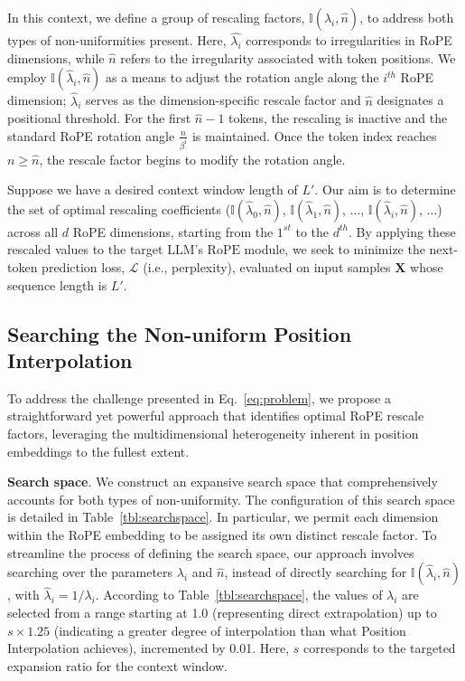 In this context, we define a group of rescaling factors, $\mathbb{I}(\hat{\lambda}_{i},\hat{n})$, to address both types of non-uniformities present. Here, $\hat{\lambda_i}$ corresponds to irregularities in RoPE dimensions, while $\hat{n}$ refers to the irregularity associated with token positions. We employ $\mathbb{I}(\hat{\lambda}_{i},\hat{n})$ as a means to adjust the rotation angle along the $i^{th}$ RoPE dimension; $\hat{\lambda}_{i}$ serves as the dimension-specific rescale factor and $\hat{n}$ designates a positional threshold. For the first $\hat{n}-1$ tokens, the rescaling is inactive and the standard RoPE rotation angle $\frac{n}{\beta^i}$ is maintained. Once the token index reaches $n\ge\hat{n}$, the rescale factor begins to modify the rotation angle.

Suppose we have a desired context window length of $L'$. Our aim is to determine the set of optimal rescaling coefficients ($\mathbb{I}(\hat{\lambda}_{0},\hat{n})$, $\mathbb{I}(\hat{\lambda}_{1},\hat{n})$, ..., $\mathbb{I}(\hat{\lambda}_{i},\hat{n})$, ...) across all $d$ RoPE dimensions, starting from the $1^{st}$ to the $d^{th}$. By applying these rescaled values to the target $\text{LLM}$'s $\text{RoPE}$ module, we seek to minimize the next-token prediction loss, $\mathcal{L}$ (i.e., perplexity), evaluated on input samples $\mathbf{X}$ whose sequence length is $L'$.

\subsection{Searching the Non-uniform Position Interpolation}

To address the challenge presented in Eq.~\ref{eq:problem}, we propose a straightforward yet powerful approach that identifies optimal RoPE rescale factors, leveraging the multidimensional heterogeneity inherent in position embeddings to the fullest extent.

\textbf{Search space}. We construct an expansive search space that comprehensively accounts for both types of non-uniformity. The configuration of this search space is detailed in Table~\ref{tbl:searchspace}. In particular, we permit each dimension within the RoPE embedding to be assigned its own distinct rescale factor. To streamline the process of defining the search space, our approach involves searching over the parameters $\lambda_i$ and $\hat{n}$, instead of directly searching for $\mathbb{I}(\hat{\lambda}_{i},\hat{n})$, with $\hat{\lambda}_{i}=1/\lambda_i$. According to Table~\ref{tbl:searchspace}, the values of $\lambda_i$ are selected from a range starting at 1.0 (representing direct extrapolation) up to $s\times1.25$ (indicating a greater degree of interpolation than what Position Interpolation achieves), incremented by 0.01. Here, $s$ corresponds to the targeted expansion ratio for the context window.

